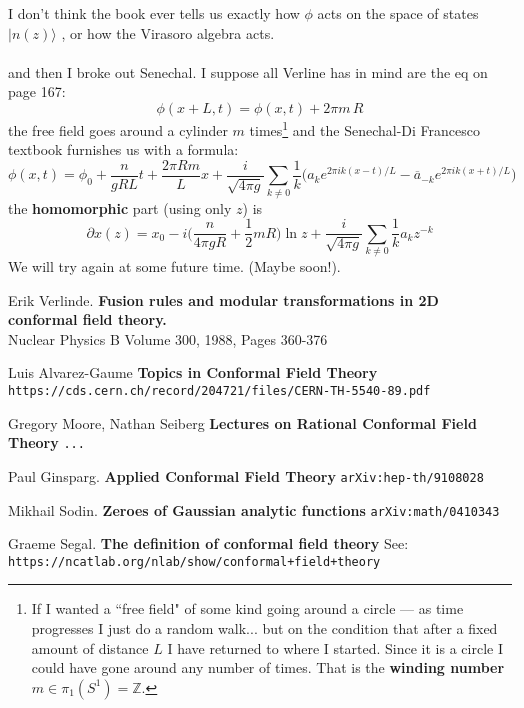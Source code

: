 \documentclass[12pt]{article}
\begin{document}
\noindent I don't think the book ever tells us exactly how $\phi$ acts on the space of states $|n(z) \rangle$ , or how the Virasoro algebra acts. \\ \\
and then I broke out Senechal.  I suppose all Verline has in mind are the eq on page 167:
$$ \phi(x + L, t) = \phi(x,t) + 2\pi m \, R $$
the free field goes around a cylinder $m$ times\footnote{If I wanted a ``free field" of some kind going around a circle --- as time progresses I just do a random walk... but on the condition that after a fixed amount of distance $L$ I have returned to where I started.  Since it is a circle I could have gone around any number of times.  That is the \textbf{winding number} $m \in \pi_1(S^1) = \mathbb{Z}$. }  and the Senechal-Di Francesco textbook furnishes us with a formula:
$$ \phi(x,t) = \phi_0 + \frac{n}{gRL} t + \frac{2\pi R m}{L} x + \frac{i}{\sqrt{4\pi g}} \sum_{k \neq 0} \frac{1}{k} \big( a_k e^{2\pi i k(x-t)/L} - \overline{a}_{-k} e^{2\pi i k (x+t)/L} \big) $$
the \textbf{homomorphic} part (using only $z$) is
$$ \partial x(z)
= x_0 - i \bigg( \frac{n}{4\pi g R} + \frac{1}{2} m R \bigg)\ln z + \frac{i}{\sqrt{4\pi g}}\sum_{k \neq 0} \frac{1}{k} a_k z^{-k}  $$
We will try again at some future time.  (Maybe soon!).

\selectfont \fontsize{12}{10}\selectfont


\begin{thebibliography}{}

\item Erik Verlinde. \textbf{Fusion rules and modular transformations in 2D conformal field theory.} \\ Nuclear Physics B
Volume 300, 1988, Pages 360-376

\item Luis Alvarez-Gaume \textbf{Topics in Conformal Field Theory} \\ \texttt{https://cds.cern.ch/record/204721/files/CERN-TH-5540-89.pdf}

\item Gregory Moore, Nathan Seiberg \textbf{Lectures on Rational Conformal Field Theory} \texttt{...}

\item Paul Ginsparg.  \textbf{Applied Conformal Field Theory} \texttt{arXiv:hep-th/9108028}

\item Mikhail Sodin. \textbf{Zeroes of Gaussian analytic functions} \texttt{arXiv:math/0410343}

\item Graeme Segal. \textbf{The definition of conformal field theory} See: \texttt{https://ncatlab.org/nlab/show/conformal+field+theory}


\end{thebibliography}
\end{document}
